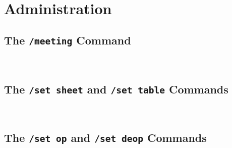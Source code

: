 \documentclass{article}
\begin{document}
\

\section{Administration}

\subsection{The \texttt{/meeting} Command}

\

\subsection{The \texttt{/set sheet} and \texttt{/set table} Commands}

\

\subsection{The \texttt{/set op} and \texttt{/set deop} Commands}

\
\end{document}

